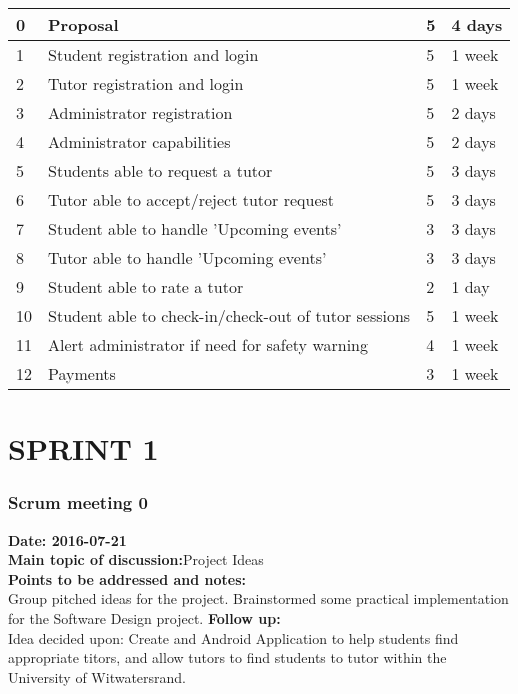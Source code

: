 \documentclass[12pt]{article}
\begin{document}
{{\begin{longtable}{| p{1.5cm} | p{8cm}| p{2cm}| p{3cm} |}
	\\ \hline 0 & Proposal & 5 & 4 days
		\\ \hline 1 & Student registration and login & 5 & 1 week\\ \hline 
			
			2 & Tutor registration and login & 5 & 1 week\\ \hline	
 
			3 & Administrator registration & 5 & 2 days \\ \hline  

			
			4 & Administrator capabilities & 5 & 2 days\\ \hline 
			
			5 & Students able to request a tutor & 5 & 3 days\\ \hline

				6 & Tutor able to accept/reject tutor request & 5 & 3 days\\ \hline

				7 & Student able to handle 'Upcoming events'  & 3 & 3 days \\ \hline	
				
				8 & Tutor able to handle 'Upcoming events'  & 3 & 3 days\\ \hline	
							
				9 & Student able to rate a tutor & 2 & 1 day\\ \hline

				10 & Student able to check-in/check-out of tutor sessions  & 5 & 1 week\\ \hline	

				11 & Alert administrator if need for safety warning  & 4 & 1 week \\ \hline	

				12 & Payments  & 3 & 1 week \\ \hline	



	
\end{longtable}
}

\section{SPRINT 1}
\subsubsection{Scrum meeting 0}
\textbf{Date: 2016-07-21}\\
\textbf{Main topic of discussion:}Project Ideas\\
\textbf{Points to be addressed and notes:}\\
Group pitched ideas for the project. Brainstormed some practical implementation for the Software Design project. 
\textbf{Follow up:}\\
Idea decided upon: Create and Android Application to help students find appropriate titors, and allow tutors to find students to tutor within the University of Witwatersrand. 
}
\end{document}
